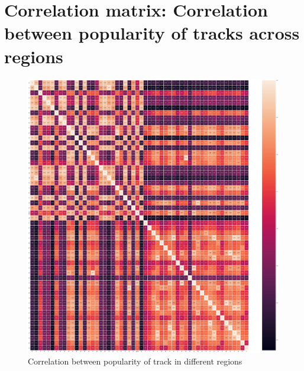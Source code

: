 \documentclass{article}
\begin{document}
\section{Correlation matrix: Correlation between popularity of tracks across regions}
\begin{figure}[!ht]
    \centering
    \includegraphics[scale = 0.19]{Figures/region_corr.jpeg}
    \caption{Correlation between popularity of track in different regions}
    \label{fig:corrRegion}
\end{figure} 
\label{appendix:a}
\end{document}
